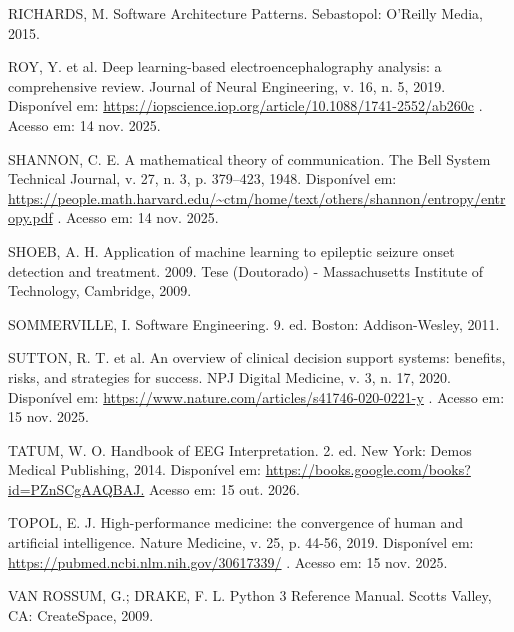 \begin{SingleSpace}
{\raggedright\setlength{\parindent}{0pt} RICHARDS, M. Software Architecture Patterns. Sebastopol: O'Reilly Media, 2015.\par}\smallskip

{\raggedright\setlength{\parindent}{0pt} ROY, Y. et al. Deep learning-based electroencephalography analysis: a comprehensive review. Journal of Neural Engineering, v. 16, n. 5, 2019. Disponível em: \url{https://iopscience.iop.org/article/10.1088/1741-2552/ab260c} . Acesso em: 14 nov. 2025.\par}\smallskip

{\raggedright\setlength{\parindent}{0pt} SHANNON, C. E. A mathematical theory of communication. The Bell System Technical Journal, v. 27, n. 3, p. 379–423, 1948. Disponível em: \url{https://people.math.harvard.edu/~ctm/home/text/others/shannon/entropy/entropy.pdf} . Acesso em: 14 nov. 2025.\par}\smallskip

{\raggedright\setlength{\parindent}{0pt} SHOEB, A. H. Application of machine learning to epileptic seizure onset detection and treatment. 2009. Tese (Doutorado) - Massachusetts Institute of Technology, Cambridge, 2009.\par}\smallskip

{\raggedright\setlength{\parindent}{0pt} SOMMERVILLE, I. Software Engineering. 9. ed. Boston: Addison-Wesley, 2011.\par}\smallskip

{\raggedright\setlength{\parindent}{0pt} SUTTON, R. T. et al. An overview of clinical decision support systems: benefits, risks, and strategies for success. NPJ Digital Medicine, v. 3, n. 17, 2020. Disponível em: \url{https://www.nature.com/articles/s41746-020-0221-y} . Acesso em: 15 nov. 2025.\par}\smallskip

{\raggedright\setlength{\parindent}{0pt} TATUM, W. O. Handbook of EEG Interpretation. 2. ed. New York: Demos Medical Publishing, 2014. Disponível em: \url{https://books.google.com/books?id=PZnSCgAAQBAJ.} Acesso em: 15 out. 2026.\par}\smallskip

{\raggedright\setlength{\parindent}{0pt} TOPOL, E. J. High-performance medicine: the convergence of human and artificial intelligence. Nature Medicine, v. 25, p. 44-56, 2019. Disponível em: \url{https://pubmed.ncbi.nlm.nih.gov/30617339/} . Acesso em: 15 nov. 2025.\par}\smallskip

{\raggedright\setlength{\parindent}{0pt} VAN ROSSUM, G.; DRAKE, F. L. Python 3 Reference Manual. Scotts Valley, CA: CreateSpace, 2009.\par}\smallskip


\end{SingleSpace}
